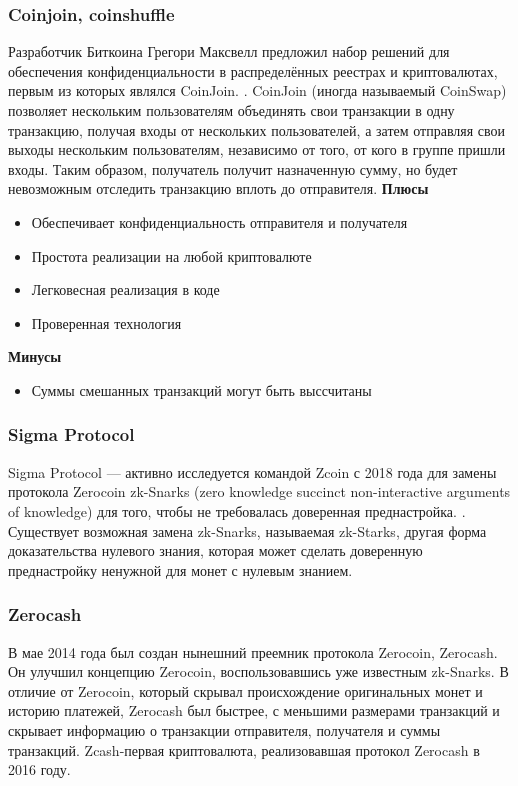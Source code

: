 \subsubsection{Coinjoin, coinshuffle}
Разработчик Биткоина Грегори Максвелл предложил набор решений для обеспечения
конфиденциальности в распределённых реестрах и криптовалютах, первым из которых
являлся CoinJoin. \cite{Maurera}. CoinJoin (иногда называемый CoinSwap)
позволяет нескольким пользователям объединять свои транзакции в одну
транзакцию, получая входы от нескольких пользователей, а затем отправляя свои
выходы нескольким пользователям, независимо от того, от кого в группе пришли
входы. Таким образом, получатель получит назначенную сумму, но будет
невозможным отследить транзакцию вплоть до отправителя.
\textbf{Плюсы}
\begin{itemize}
    \item Обеспечивает конфиденциальность отправителя и получателя
    \item Простота реализации на любой криптовалюте
    \item Легковесная реализация в коде
    \item Проверенная технология
\end{itemize}
\textbf{Минусы}
\begin{itemize}
    \item Суммы смешанных транзакций могут быть выссчитаны
\end{itemize}

\subsubsection{Sigma Protocol}
Sigma Protocol --- активно исследуется командой Zcoin с 2018 года для замены
протокола Zerocoin zk-Snarks (zero knowledge succinct non-interactive arguments of
knowledge) для того, чтобы не требовалась доверенная
преднастройка. \cite{Groth2015}. Существует возможная замена zk-Snarks,
называемая zk-Starks, другая форма доказательства нулевого знания, которая
может сделать доверенную преднастройку ненужной для монет с нулевым знанием.

\subsubsection{Zerocash}
В мае 2014 года был создан нынешний преемник протокола Zerocoin, Zerocash. Он
улучшил концепцию Zerocoin, воспользовавшись уже известным zk-Snarks. В отличие
от Zerocoin, который скрывал происхождение оригинальных монет и историю
платежей, Zerocash был быстрее, с меньшими размерами транзакций и скрывает
информацию о транзакции отправителя, получателя и суммы транзакций.
Zcash-первая криптовалюта, реализовавшая протокол Zerocash в 2016 году.
\cite{ZerocoinElectricCoinCompany2016}

